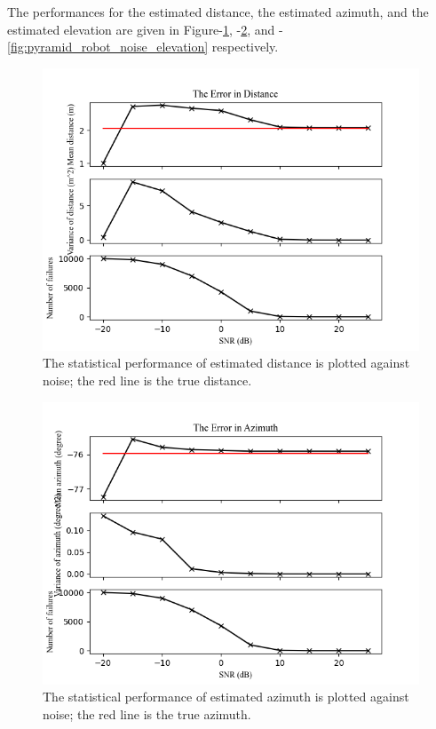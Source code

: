 \documentclass{report}
\begin{document}
The performances for the estimated distance, the estimated azimuth, and the estimated elevation are given in Figure-\ref{fig:pyramid_robot_noise_distance}, -\ref{fig:pyramid_robot_noise_azimuth}, and -\ref{fig:pyramid_robot_noise_elevation} respectively.


\begin{figure}[H]
\includegraphics[width=1\textwidth]{../Python/pyramid_robot/noise_distance.png}
\centering
\caption{The statistical performance of estimated distance is plotted against noise; the red line is the true distance.}
\label{fig:pyramid_robot_noise_distance}
\centering
\end{figure}

\begin{figure}[H]
\includegraphics[width=1\textwidth]{../Python/pyramid_robot/noise_azimuth.png}
\centering
\caption{The statistical performance of estimated azimuth is plotted against noise; the red line is the true azimuth.}
\label{fig:pyramid_robot_noise_azimuth}
\centering
\end{figure}
\end{document}
